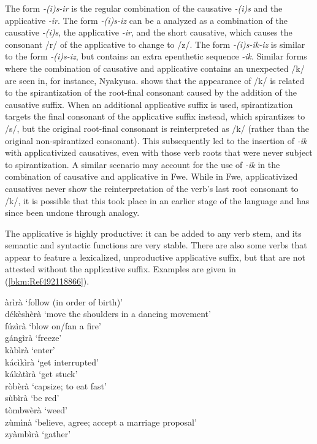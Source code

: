 The form \textit{-(i)s-ir} is the regular combination of the causative \textit{-(i)s} and the applicative \textit{-ir}. The form \textit{-(i)s-iz} can be a analyzed as a combination of the causative \textit{-(i)s}, the applicative \textit{-ir}, and the short causative, which causes the consonant /r/ of the applicative to change to /z/. The form \textit{-(i)s-ik-iz} is similar to the form \textit{-(i)s-iz}, but contains an extra epenthetic sequence \textit{-ik}. Similar forms where the combination of causative and applicative contains an unexpected /k/ are seen in, for instance, Nyakyusa. {\citet{Hyman2003a}} shows that the appearance of /k/ is related to the spirantization of the root-final consonant caused by the addition of the causative suffix. When an additional applicative suffix is used, spirantization targets the final consonant of the applicative suffix instead, which spirantizes to /s/, but the original root-final consonant is reinterpreted as /k/ (rather than the original non-spirantized consonant). This subsequently led to the insertion of \textit{-ik} with applicativized causatives, even with those verb roots that were never subject to spirantization. A similar scenario may account for the use of \textit{-ik} in the combination of causative and applicative in Fwe. While in Fwe, applicativized causatives never show the reinterpretation of the verb’s last root consonant to /k/, it is possible that this took place in an earlier stage of the language and has since been undone through analogy.

The applicative is highly productive: it can be added to any verb stem, and its semantic and syntactic functions are very stable. There are also some verbs that appear to feature a lexicalized, unproductive applicative suffix, but that are not attested without the applicative suffix. Examples are given in (\ref{bkm:Ref492118866}).

\ea
\label{bkm:Ref492118866}
àrìrà \tab ‘follow (in order of birth)’\\
dékèshèrà \tab ‘move the shoulders in a dancing movement’\\
fúzìrà \tab ‘blow on/fan a fire’\\
gángìrà \tab ‘freeze’\\
kàbìrà \tab ‘enter’\\
kácìkìrà \tab ‘get interrupted’\\
kákàtìrà \tab ‘get stuck’\\
ròbèrà \tab ‘capsize; to eat fast’\\
sùbìrà \tab ‘be red’\\
tòmbwèrà \tab ‘weed’\\
zùmìnà \tab ‘believe, agree; accept a marriage proposal’\\
zyàmbìrà \tab ‘gather’\\
\z

